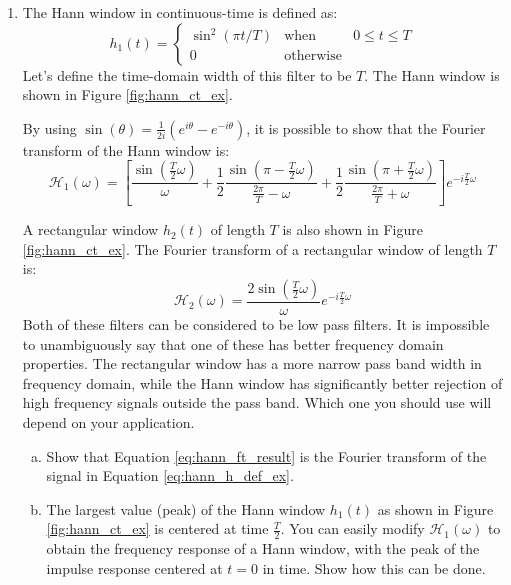 \begin{enumerate}
\item The Hann window in continuous-time is defined as:
  \begin{equation} h_1(t)= \left\{ \begin{array}{ccc} \sin^2(\pi t/T)
    & \mathrm{when} & 0 \le t \le T \\ 0 & \mathrm{otherwise}
    & \end{array} \right.  \label{eq:hann_h_def_ex} \end{equation}
    Let's define the time-domain width of this filter to be $T$. The
    Hann window is shown in Figure \ref{fig:hann_ct_ex}.

  By using $\sin(\theta) = \frac{1}{2i}(e^{i\theta} - e^{-i\theta})$, it is possible to show that the Fourier transform of the Hann window is:
  \begin{equation}
    \mathcal{H}_1(\omega) = \left[ \frac{\sin(\frac{T}{2}\omega)}{\omega} + \frac{1}{2}\frac{\sin(\pi-\frac{T}{2}\omega)}{\frac{2\pi}{T}-\omega} +  \frac{1}{2}\frac{\sin(\pi+\frac{T}{2}\omega)}{\frac{2\pi}{T}+\omega}  \right] e^{-i\frac{T}{2}\omega}
    \label{eq:hann_ft_result}
  \end{equation}

A rectangular window $h_2(t)$ of length $T$ is also shown in
      Figure \ref{fig:hann_ct_ex}. The Fourier transform of a
      rectangular window of length $T$
      is:
      \begin{equation}
      \mathcal{H}_2(\omega)= \frac{2\sin(\frac{T}{2}\omega)}{\omega}e^{-i \frac{T}{2}\omega}
      \end{equation}      
Both of these filters can be considered to be low pass filters. It is
impossible to unambiguously say that one of these has better frequency
domain properties. The rectangular window has a more narrow pass band
width in frequency domain, while the Hann window has significantly
better rejection of high frequency signals outside the pass
band. Which one you should use will depend on your application.

  \begin{enumerate}[a)]
    \item Show that Equation \ref{eq:hann_ft_result} is the Fourier transform of the signal in Equation \ref{eq:hann_h_def_ex}.
    
    \item The largest value (peak) of the Hann window $h_1(t)$ as
      shown in Figure \ref{fig:hann_ct_ex} is centered at time
      $\frac{T}{2}$. You can easily modify $\mathcal{H}_1(\omega)$ to
      obtain the frequency response of a Hann window, with the peak of
      the impulse response centered at $t=0$ in time. Show how this
      can be done.


\end{enumerate}
\end{enumerate}
